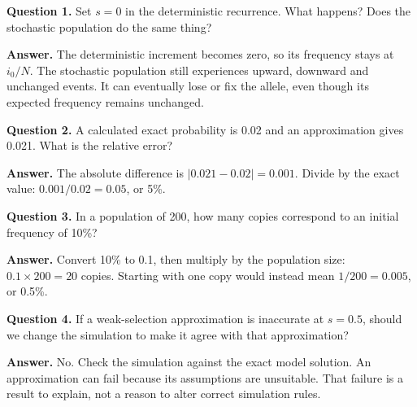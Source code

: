 \begin{checkpoint}
\textbf{Question 1.} Set $s=0$ in the deterministic recurrence. What happens? Does the stochastic population do the same thing?

\textbf{Answer.} The deterministic increment becomes zero, so its frequency stays at $i_0/N$. The stochastic population still experiences upward, downward and unchanged events. It can eventually lose or fix the allele, even though its expected frequency remains unchanged.

\medskip
\textbf{Question 2.} A calculated exact probability is 0.02 and an approximation gives 0.021. What is the relative error?

\textbf{Answer.} The absolute difference is $|0.021-0.02|=0.001$. Divide by the exact value: $0.001/0.02=0.05$, or 5\%.

\medskip
\textbf{Question 3.} In a population of 200, how many copies correspond to an initial frequency of 10\%?

\textbf{Answer.} Convert 10\% to 0.1, then multiply by the population size: $0.1\times200=20$ copies. Starting with one copy would instead mean $1/200=0.005$, or 0.5\%.

\medskip
\textbf{Question 4.} If a weak-selection approximation is inaccurate at $s=0.5$, should we change the simulation to make it agree with that approximation?

\textbf{Answer.} No. Check the simulation against the exact model solution. An approximation can fail because its assumptions are unsuitable. That failure is a result to explain, not a reason to alter correct simulation rules.
\end{checkpoint}
